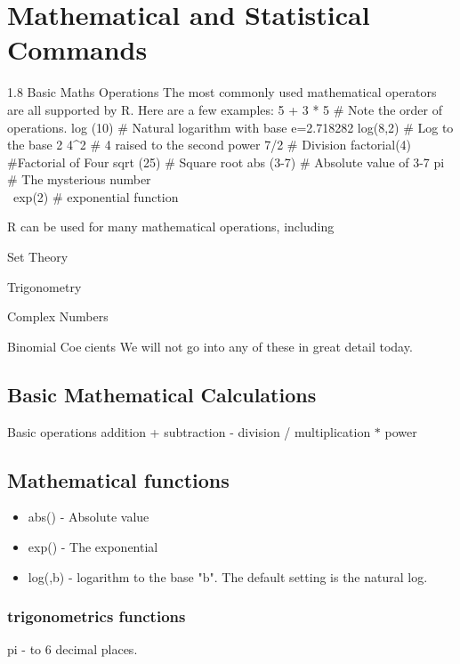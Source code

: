 \documentclass[a4paper,12pt]{article}
\begin{document}
\tableofcontents
\section{Mathematical and Statistical Commands}
1.8 Basic Maths Operations
The most commonly used mathematical operators are all supported by R. Here are a few
examples:
5 + 3 * 5 # Note the order of operations.
log (10) # Natural logarithm with base e=2.718282
log(8,2) # Log to the base 2
4^2 # 4 raised to the second power
7/2 # Division
factorial(4) #Factorial of Four
sqrt (25) # Square root
abs (3-7) # Absolute value of 3-7
pi # The mysterious number \\\
exp(2) # exponential function

R can be used for many mathematical operations, including
\item Set Theory
\item Trigonometry
\item Complex Numbers
\item Binomial Coecients
We will not go into any of these in great detail today.

\subsection{Basic Mathematical Calculations}
Basic operations
addition  +      
subtraction    	-
division   /     
multiplication   $\ast$
power     


\subsection*{Mathematical functions}
\begin{itemize}
\item abs()       - Absolute value 
\item exp()	   - The exponential
\item log(,b)     - logarithm to the base "b". The default setting is the natural log.
\end{itemize}
\subsubsection*{trigonometrics functions}

pi            -  to 6 decimal places.
\end{document}
